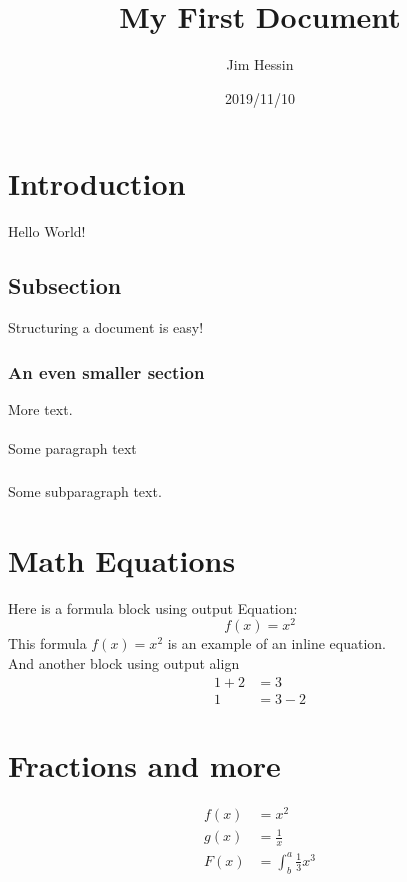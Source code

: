 \documentclass{article}
\title{My First Document}
\date{2019/11/10}
\author{Jim Hessin}
\begin{document}
  \newpage

  \section{Introduction}

  Hello World!

  \subsection{Subsection}

  Structuring a document is easy!

  \subsubsection{An even smaller section}

  More text.

  \paragraph{}

  Some paragraph text

  \subparagraph{}

  Some subparagraph text.

  \section{Math Equations}

  Here is a formula block
  using output Equation:
  \begin{equation*}
    f(x) = x^2
  \end{equation*}
  This formula $f(x) = x^2$ is an example of an inline equation. \\
  And another block using output align
  \begin{align*}
    1 + 2 &= 3 \\
    1 &= 3 - 2
  \end{align*}

  \section{Fractions and more}

  \begin{align*}
    f(x) &= x^2 \\
    g(x) &= \frac{1}{x}\\
    F(x) &= \int^a_b \frac{1}{3}x^3
  \end{align*}
\end{document}

